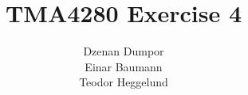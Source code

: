 


\author{Dzenan Dumpor \\ Einar Baumann \\ Teodor Heggelund}
\title{TMA4280 Exercise 4}


\maketitle

